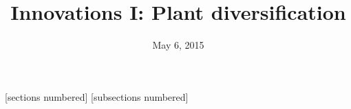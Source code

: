 





\title[Innovations I: Plant diversification]{Innovations I: Plant diversification}
\date{May 6, 2015}


[sections numbered]
[subsections numbered]



\begin{noheadline}
\maketitle
\end{noheadline}




